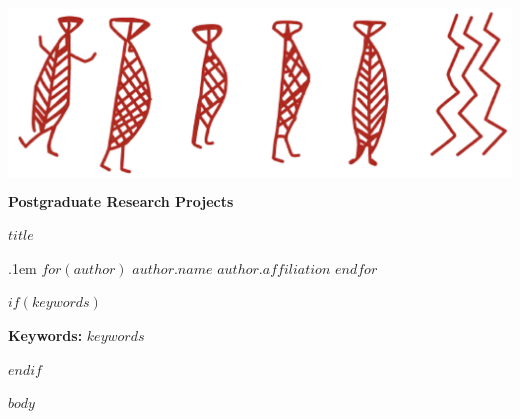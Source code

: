 \documentclass[hidelinks,12pt,a4paper]{article}
\newcommand{\titlesize}{\fontsize{22.0}{20pt}\selectfont}
\begin{document}
\begin{sf}
\begin{center}
\includegraphics[height=50mm]{MM_Head}\\
\titlesize\textbf{Postgraduate Research Projects} \par
\end{center}
{\raggedright %
\begin{minipage}[t]{170mm}
  \vskip 2.5pt%
{\raggedright\large\textbf{$title$} \par}
    \end{minipage}

{\par\large%
      \vspace*{5mm}
      \lineskip .1em%
$for(author)$
                               \textbf{$author.name$} \hskip 15pt \emph{\small $author.affiliation$}      \vskip 5pt 
 $endfor$
     \vskip 10pt%
         {\noindent\usebox\absbox\par}
         
 $if(keywords)$
    {\vspace{1pt}%
      {\noindent\normalsize \textbf{Keywords:} $keywords$ }\par}
      \vspace{1mm}
      \par%
$endif$    
 
 
 
  }}
\end{sf}



 
 $body$
\end{document}
